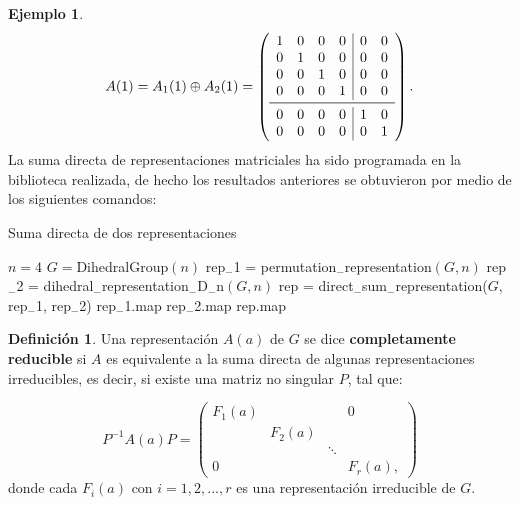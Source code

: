 \documentclass[12pt]{book}
\theoremstyle{definition}
\newtheorem{definition}[theorem]{Definición}
\newtheorem{example}[theorem]{Ejemplo}
\newcounter{in}
\newcounter{ini}
\begin{document}
\begin{example}
\[
A(1) = A_{1}(1) \oplus A_{2}(1) =
\left( \begin{array}{cccc|cc}
1 & 0 & 0 & 0 & 0 & 0 \\
0 & 1 & 0 & 0 & 0 & 0 \\
0 & 0 & 1 & 0 & 0 & 0 \\
0 & 0 & 0 & 1 & 0 & 0 \\
\midrule
0 & 0 & 0 & 0 & 1 & 0 \\
0 & 0 & 0 & 0 & 0 & 1 \\
\end{array}\right).
\]
La suma directa de representaciones matriciales ha sido programada en
la biblioteca realizada, de hecho los resultados anteriores se
obtuvieron por medio de los siguientes comandos:
\begin{algorithm}[H]
\caption{Suma directa de dos representaciones}
\begin{algorithmic}
\REQUIRE $n = 4$
\REQUIRE $G = $DihedralGroup$(n)$
\STATE rep$_{-}$1 = permutation$_{-}$representation$(G, n)$
\STATE rep$_{-}$2 = dihedral$_{-}$representation$_{-}$D$_{-}$n$(G,n)$
\STATE rep = direct$_{-}$sum$_{-}$representation($G$, rep$_{-}$1, rep$_{-}$2)
\PRINT rep$_{-}$1.map
\PRINT rep$_{-}$2.map
\PRINT rep.map
\end{algorithmic}
\end{algorithm}
\end{example}
\begin{definition}
Una representación $A\left(a\right)$ de $G$ se dice
\textbf{completamente reducible} si $A$ es equivalente a la suma
directa de algunas representaciones irreducibles, es decir, si existe
una matriz no singular $P$, tal que:

\begin{equation*}
 P^{-1}A\left(a\right)P=
 \begin{pmatrix}
   F_{1}(a) & & & 0\\
   & F_{2}(a) & & \\
   & & \ddots & \\
   0 & & & F_{r}(a),
 \end{pmatrix}
\end{equation*}
donde cada $F_{i}\left(a\right)$ con $i=1,2,...,r$ es una
representación irreducible de $G$.
\end{definition}
\end{document}
